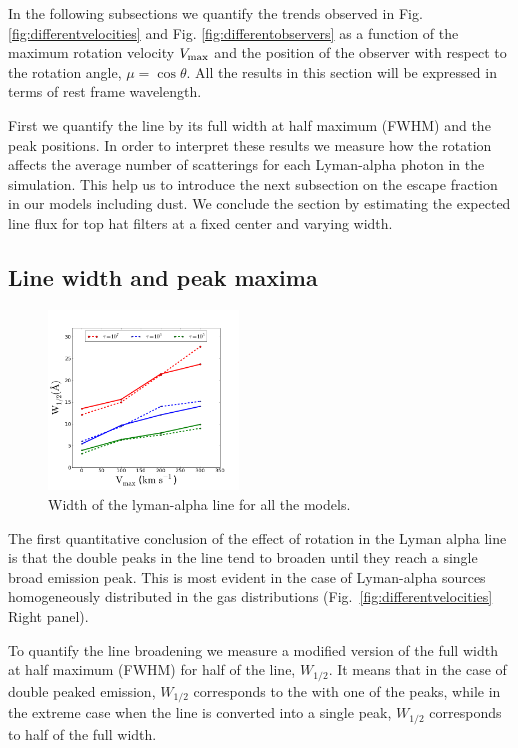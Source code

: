 \documentclass[usenatbib]{mn2e}
\begin{document}
In the following subsections we quantify the trends observed in
Fig. \ref{fig:differentvelocities} and
Fig. \ref{fig:differentobservers} as a function of the maximum
rotation velocity $V_{\rm max}$ and the position of the observer with
respect to the rotation angle, $\mu = \cos{\theta}$. All the results
in this section will be expressed in terms of rest frame wavelength.

First we quantify the line by its full width at half maximum
(FWHM) and the peak positions. In order to interpret these results we
measure how the rotation affects the average number of scatterings
for each Lyman-alpha photon in the simulation. This help us to
introduce the next subsection on the escape fraction in our models
including dust. We conclude the section by estimating the
expected line flux for top hat filters at a fixed center and varying
width. 

\subsection{Line width and peak maxima}
\label{sec:widthpeak}
\label{fig:differentvelocities}

\begin{figure}
    \includegraphics[width=0.45\textwidth]{WidthvsVmax.png}
\caption{Width of the lyman-alpha line for all the models.\label{fig:widthvsvelocity}}
\end{figure}


The first quantitative conclusion of the effect of rotation in the
Lyman alpha line is that the double peaks in the line tend to broaden
until they reach a single broad emission peak. This is most evident in
the case of Lyman-alpha sources homogeneously distributed in the gas
distributions (Fig.~\ref{fig:differentvelocities} Right panel).

To quantify the line broadening we measure a modified version of the full
width at half maximum (FWHM) for half of the line, $W_{1/2}$. It means that in
the case of double peaked emission, $W_{1/2}$ corresponds to the with
one of the peaks, while in the extreme case when the line is converted
into a single peak, $W_{1/2}$ corresponds to half of the full width. 
\end{document}
